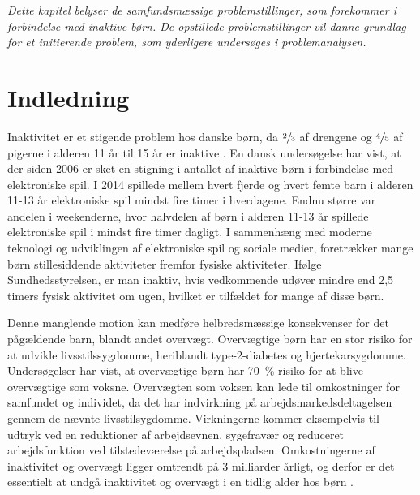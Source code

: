 \textit{Dette kapitel belyser de samfundsmæssige problemstillinger, som forekommer i forbindelse med inaktive børn. De opstillede problemstillinger vil danne grundlag for et initierende problem, som yderligere undersøges i problemanalysen.}

\section{Indledning}
Inaktivitet er et stigende problem hos danske børn, da $\sfrac{2}{3}$ af drengene og $\sfrac{4}{5}$ af pigerne i alderen 11 år til 15 år er inaktive \citep{SundhedsstyrrelsenFaktaark}. %
En dansk undersøgelse har vist, at der siden 2006 er sket en stigning i antallet af inaktive børn i forbindelse med elektroniske spil. I 2014 spillede mellem hvert fjerde og hvert femte barn i alderen 11-13 år elektroniske spil mindst fire timer i hverdagene. Endnu større var andelen i weekenderne, hvor halvdelen af børn i alderen 11-13 år spillede elektroniske spil i mindst fire timer dagligt. \citep{Universitet2014}  I sammenhæng med moderne teknologi  og udviklingen af elektroniske spil og sociale medier, foretrækker mange børn stillesiddende aktiviteter fremfor fysiske aktiviteter. \citep{Universitet2014} Ifølge Sundhedsstyrelsen, er man inaktiv, hvis vedkommende udøver mindre end 2,5 timers fysisk aktivitet om ugen, hvilket er tilfældet for mange af disse børn.  \citep{Kiens2007}

Denne manglende motion kan medføre helbredsmæssige konsekvenser for det pågældende barn, blandt andet overvægt. Overvægtige børn har en stor risiko for at udvikle livsstilssygdomme, heriblandt type-2-diabetes og hjertekarsygdomme. Undersøgelser har vist, at overvægtige børn har 70~\% risiko for at blive overvægtige som voksne. \citep{Reilly2006} 
Overvægten som voksen kan lede til omkostninger for samfundet og individet, da det har indvirkning på arbejdsmarkedsdeltagelsen gennem de nævnte livsstilsygdomme. Virkningerne kommer eksempelvis til udtryk ved en reduktioner af arbejdsevnen, sygefravær og reduceret arbejdsfunktion ved tilstedeværelse på arbejdspladsen. Omkostningerne af inaktivitet og overvægt ligger omtrendt på 3 milliarder årligt, og derfor er det essentielt at undgå inaktivitet og overvægt i en tidlig alder hos børn \citep{BarudThomsen2007, Sundhedsministeriet2007}.

